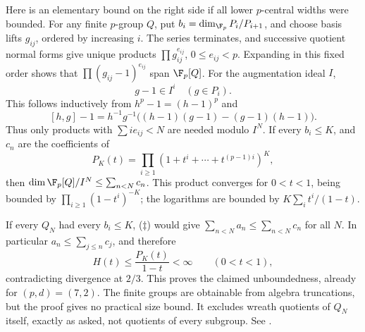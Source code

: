Here is an elementary bound on the right side if all lower
\(p\)-central widths were bounded.
For any finite \(p\)-group \(Q\), put
\(b_i=\dim_{\F_p}P_i/P_{i+1}\), and choose basis lifts \(g_{ij}\),
ordered by increasing \(i\). The series terminates, and successive
quotient normal forms give unique products
\(\prod g_{ij}^{e_{ij}}\), \(0\le e_{ij}<p\).
Expanding in this fixed order shows that
\(\prod(g_{ij}-1)^{e_{ij}}\) span \(\F_p[Q]\).
For the augmentation ideal \(I\),
\[
 g-1\in I^i\quad(g\in P_i).
\]
This follows inductively from \(h^p-1=(h-1)^p\) and
\[
 [h,g]-1=h^{-1}g^{-1}
 \bigl((h-1)(g-1)-(g-1)(h-1)\bigr).
\]
Thus only products with \(\sum i e_{ij}<N\) are needed modulo \(I^N\).
If every \(b_i\le K\), and \(c_n\) are the coefficients of
\[
 P_K(t)=\prod_{i\ge1}(1+t^i+\cdots+t^{(p-1)i})^K,
\]
then \(\dim\F_p[Q]/I^N\le\sum_{n<N}c_n\).
This product converges for \(0<t<1\), being bounded by
\(\prod_{i\ge1}(1-t^i)^{-K}\); the logarithms are bounded by
\(K\sum_i t^i/(1-t)\).

If every \(Q_N\) had every \(b_i\le K\), (\(\ddagger\)) would give
\(\sum_{n<N}a_n\le\sum_{n<N}c_n\) for all \(N\).
In particular \(a_n\le\sum_{j\le n}c_j\), and therefore
\[
 H(t)\le\frac{P_K(t)}{1-t}<\infty\qquad(0<t<1),
\]
contradicting divergence at \(2/3\).
This proves the claimed unboundedness, already for \((p,d)=(7,2)\).
The finite groups are obtainable from algebra truncations, but the
proof gives no practical size bound. It excludes wreath quotients
of \(Q_N\) itself, exactly as asked, not quotients of every subgroup.
See .
